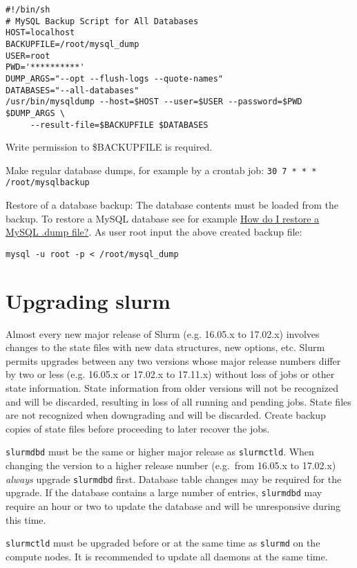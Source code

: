 \begin{verbatim}
#!/bin/sh
# MySQL Backup Script for All Databases
HOST=localhost
BACKUPFILE=/root/mysql_dump
USER=root
PWD='**********'
DUMP_ARGS="--opt --flush-logs --quote-names"
DATABASES="--all-databases"
/usr/bin/mysqldump --host=$HOST --user=$USER --password=$PWD $DUMP_ARGS \
     --result-file=$BACKUPFILE $DATABASES
\end{verbatim}

Write permission to \$BACKUPFILE is required.

Make regular database dumps, for example by a crontab job:
\texttt{30 7 * * * /root/mysqlbackup}

Restore of a database backup: The database contents must be loaded from the backup. To restore a MySQL database see for example \href{http://stackoverflow.com/questions/105776/how-do-i-restore-a-mysql-dump-file}{How do I restore a MySQL .dump file?}. As user root input the above created backup file:

\texttt{mysql -u root -p < /root/mysql\_dump}

\section{Upgrading slurm} \label{sec:slurmupgrade}

Almost every new major release of Slurm (e.g. 16.05.x to 17.02.x) involves changes to the state files with new data structures, new options, etc. Slurm permits upgrades between any two versions whose major release numbers differ by two or less (e.g. 16.05.x or 17.02.x to 17.11.x) without loss of jobs or other state information. State information from older versions will not be recognized and will be discarded, resulting in loss of all running and pending jobs. State files are not recognized when downgrading and will be discarded. Create backup copies of state files before proceeding to later recover the jobs.

\texttt{slurmdbd} must be the same or higher major release as \texttt{slurmctld}. When changing the version to a higher release number (e.g.\ from 16.05.x to 17.02.x) \emph{always} upgrade \texttt{slurmdbd} first. Database table changes may be required for the upgrade. If the database contains a large number of entries, \texttt{slurmdbd} may require an hour or two to update the database and will be unresponsive during this time.

\texttt{slurmctld} must be upgraded before or at the same time as \texttt{slurmd} on the compute nodes. It is recommended to update all daemons at the same time.

